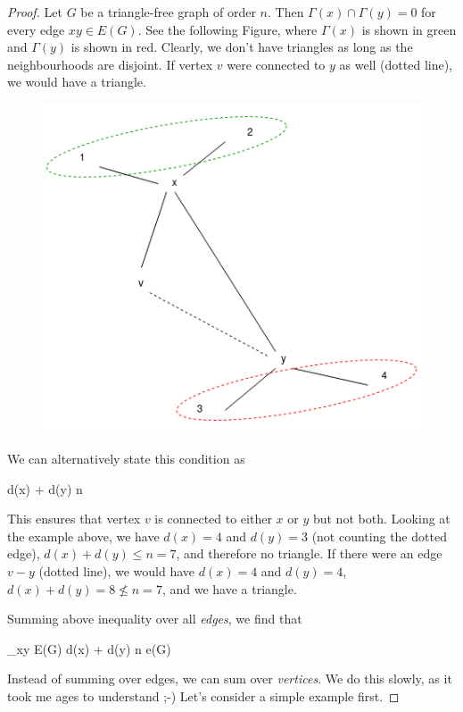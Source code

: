 \begin{proof}
  Let $G$ be a triangle-free graph of order $n$. Then $\Gamma(x) \cap \Gamma(y) = 0$ for every edge $xy \in E(G)$. See the following Figure, where $\Gamma(x)$ is shown in green and $\Gamma(y)$ is shown in red. Clearly, we don't have triangles as long as the neighbourhoods are disjoint. If vertex $v$ were connected to $y$ as well (dotted line), we would have a triangle.

  \begin{figure}[H]
    \centering
    \includegraphics[scale=0.5]{images/graphs_03_03.png}
  \end{figure}
  
  We can alternatively state this condition as
  
  \bee
  d(x) + d(y) \leq n
  \eee
  
  This ensures that vertex $v$ is connected to either $x$ or $y$ but not both. Looking at the example above, we have $d(x) = 4$ and $d(y) = 3$ (not counting the dotted edge), $d(x) + d(y) \leq n = 7$, and therefore no triangle. If there were an edge $v-y$ (dotted line), we would have $d(x) = 4$ and $d(y) = 4$, $d(x) + d(y) = 8 \nleq n = 7$, and we have a triangle.

  Summing above inequality over all \emph{edges}, we find that

  \bee
  \sum_{xy \in E(G)} d(x) + d(y) \leq n e(G)
  \eee

  Instead of summing over edges, we can sum over \emph{vertices}. We do this slowly, as it took me ages to understand ;-) Let's consider a simple example first.
  

\end{proof}
